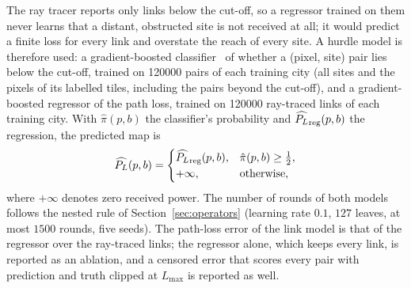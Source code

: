 The ray tracer reports only links below the cut-off, so a regressor trained
on them never learns that a distant, obstructed site is not received at all;
it would predict a finite loss for every link and overstate the reach of
every site. A hurdle model is therefore used: a gradient-boosted
classifier~\cite{ke2017lightgbm} of whether a (pixel, site) pair lies below
the cut-off, trained on \num{120000} pairs of each training city (all sites
and the pixels of its labelled tiles, including the pairs beyond the
cut-off), and a gradient-boosted regressor of the path loss, trained on
\num{120000} ray-traced links of each training city. With $\hat\pi(p,b)$
the classifier's probability and $\widehat{P_{L}}_{\mathrm{reg}}(p,b)$ the
regression, the predicted map is
\begin{equation}
\widehat{P_{L}}(p,b)=\begin{cases}
\widehat{P_{L}}_{\mathrm{reg}}(p,b), & \hat\pi(p,b)\ge\tfrac12,\\
+\infty, & \text{otherwise},
\end{cases}
\label{eq:hurdle}
\end{equation}
where $+\infty$ denotes zero received power. The number of rounds of both
models follows the nested rule of Section~\ref{sec:operators} (learning rate
$0.1$, $127$ leaves, at most $1500$ rounds, five seeds). The path-loss error
of the link model is that of the regressor over the ray-traced links; the
regressor alone, which keeps every link, is reported as an ablation, and a
censored error that scores every pair with prediction and truth clipped at
$L_{\max}$ is reported as well.

